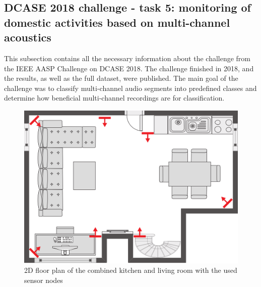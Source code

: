 \subsection[DCASE 2018 challenge - task 5 dataset]{DCASE 2018 challenge - task 5: monitoring of domestic activities based on multi-channel acoustics}
\label{sub:DCASE-Task-Dataset}
This subsection contains all the necessary information about the challenge from the IEEE AASP Challenge on \gls{DCASE} 2018. The challenge finished in 2018, and the results, as well as the full dataset, were published. The main goal of the challenge was to classify multi-channel audio segments into predefined classes and determine how beneficial multi-channel recordings are for classification. 
\begin{figure}[htbp]
	\centering
	\includegraphics[scale=0.8]{img/DCASE_floor_map.png}
	\caption[2D floor plan of the combined kitchen and living room from DCASE]{2D floor plan of the combined kitchen and living room with the used sensor nodes\footnotemark}
	\label{fig:dcase-recordings-floor-plan}
\end{figure}
